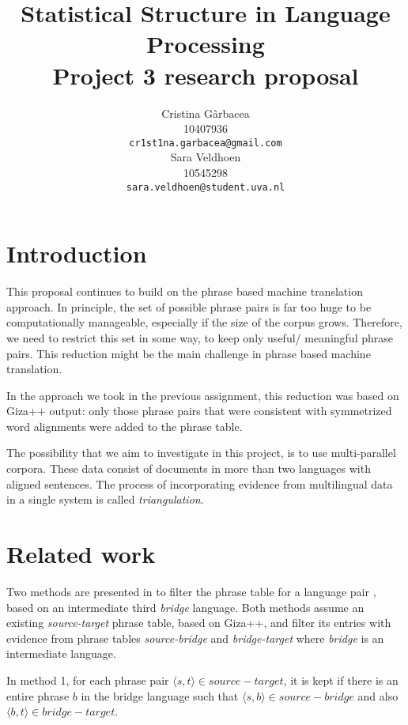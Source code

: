 \documentclass[11pt]{article}
\title{Statistical Structure in Language Processing \\Project 3 research proposal}
\author{ Cristina G\^arbacea\\
  10407936 \\
  {\small \tt cr1st1na.garbacea@gmail.com} 
  \\\And
  Sara Veldhoen \\
10545298   \\
  {\small \tt sara.veldhoen@student.uva.nl} \\}
\date{}
\begin{document}
\maketitle


\section{Introduction}
This proposal continues to build on the phrase based machine translation approach.
In principle, the set of possible phrase pairs is far too huge to be computationally manageable, especially if the size of the corpus grows.
Therefore, we need to restrict this set in some way, to keep only useful/ meaningful phrase pairs. This reduction might be the main challenge in phrase based machine translation.

In the approach we took in the previous assignment, this reduction was based on Giza++ output: only those phrase pairs that were consistent with symmetrized word alignments were added to the phrase table.

The possibility that we aim to investigate in this project, is to use multi-parallel corpora. These data consist of documents in more than two languages with aligned sentences. The process of incorporating evidence from multilingual data in a single system is called \emph{triangulation}. 

\section{Related work}

Two methods are presented in \cite{chen} to filter the phrase table for a language pair%
, based on an intermediate third \emph{bridge} language. 
 Both methods assume an existing {\em source-target} phrase table, based on Giza++, and filter its entries with evidence from phrase tables {\em source-bridge} and {\em bridge-target} where {\em bridge} is an intermediate language.

In method 1, for each phrase pair $\langle s, t\rangle \in source-target$, it is kept if there is an entire phrase $b$ in the bridge language such that $\langle s,b\rangle \in source-bridge$ and also $\langle b,t\rangle \in bridge-target$.
\end{document}
